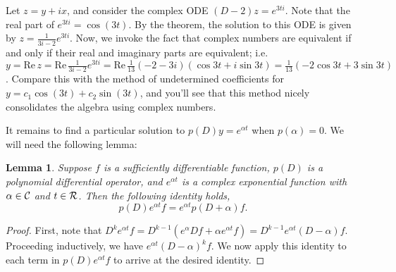 \documentclass{amsart} %
\newtheorem{lemma}{Lemma}
\begin{document}
Let $z = y+ix$, and consider the complex ODE $(D - 2)z = e^{3ti}$. Note that
the real part of $e^{3ti} = \cos(3t)$.  By the theorem, the solution to this
ODE is given by $z = \frac 1{3i - 2} e^{3ti}$.  Now, we invoke the fact that
complex numbers are equivalent if and only if their real and imaginary parts
are equivalent; i.e. $y = \mathrm{Re}\, z = \mathrm{Re}\, \frac 1{3i - 2}
e^{3ti} = \mathrm{Re}\, \frac 1{13} (-2 - 3i) (\cos 3t + i\sin 3t) = \frac
1{13}(-2\cos 3t + 3\sin 3t)$.  Compare this with the method of undetermined
coefficients for $y = c_1 \cos(3t) + c_2 \sin(3t)$, and you'll see that this method
nicely consolidates the algebra using complex numbers.

It remains to find a particular solution to $p(D)y = e^{\alpha t}$ when $p(\alpha) = 0$.  We will need the following lemma:
\begin{lemma}
  Suppose $f$ is a sufficiently differentiable function, $p(D)$ is a polynomial
  differential operator, and $e^{\alpha t}$ is a complex exponential function
  with $\alpha \in \mathcal C$ and $t \in \mathcal R$.  Then the following identity holds,
  $$
    p(D) e^{\alpha t} f = e^{\alpha t} p(D + \alpha) f.
  $$
\end{lemma}
\begin{proof}
First, note that $D^k e^{\alpha t} f = D^{k-1} (e^{\alpha} D f + \alpha e^{\alpha t}f) = D^{k-1}e^{\alpha t} (D - \alpha) f$.  Proceeding inductively, we have $e^{\alpha t} (D-\alpha)^k f$.  We now apply this identity to each term in $p(D)e^{\alpha t} f$ to arrive at the desired identity.
\end{proof}
\end{document}
